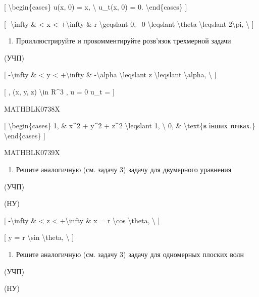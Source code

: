 \documentclass[
]{article}
\providecommand{\tightlist}{%
  \setlength{\itemsep}{0pt}\setlength{\parskip}{0pt}}
\begin{document}
{[} \textbackslash begin\{cases\} u(x, 0) = x, \textbackslash{} u\_t(x,
0) = 0. \textbackslash end\{cases\} {]}

{[} -\textbackslash infty \& \textless{} x \textless{}
+\textbackslash infty \& r \textbackslash geqslant 0, ~0
\textbackslash leqslant \textbackslash theta \textbackslash leqslant
2\textbackslash pi, \textbackslash{} {]}

\begin{enumerate}
\def\labelenumi{\arabic{enumi}.}
\setcounter{enumi}{2}
\tightlist
\item
  Проиллюстрируйте и прокомментируйте розв'язок трехмерной задачи
\end{enumerate}

(УЧП)

{[} -\textbackslash infty \& \textless{} y \textless{}
+\textbackslash infty \& -\textbackslash alpha \textbackslash leqslant z
\textbackslash leqslant \textbackslash alpha, \textbackslash{} {]}

{[} , (x, y, z) \textbackslash in R\^{}3 , u = 0 u\_t = {]}

MATHBLK0738X

{[} \textbackslash begin\{cases\} 1, \& x\^{}2 + y\^{}2 + z\^{}2
\textbackslash leqslant 1, \textbackslash{} 0, \& \textbackslash text\{в
інших точках.\} \textbackslash end\{cases\} {]}

MATHBLK0739X

\begin{enumerate}
\def\labelenumi{\arabic{enumi}.}
\setcounter{enumi}{3}
\tightlist
\item
  Решите аналогичную (см. задачу 3) задачу для двумерного уравнения
\end{enumerate}

(УЧП)

(НУ)

{[} -\textbackslash infty \& \textless{} z \textless{}
+\textbackslash infty \& x = r \textbackslash cos \textbackslash theta,
\textbackslash{} {]}

{[} y = r \textbackslash sin \textbackslash theta, \textbackslash{} {]}

\begin{enumerate}
\def\labelenumi{\arabic{enumi}.}
\setcounter{enumi}{4}
\tightlist
\item
  Решите аналогичную (см. задачу 3) задачу для одномерных плоских волн
\end{enumerate}

(УЧП)

(НУ)
\end{document}
